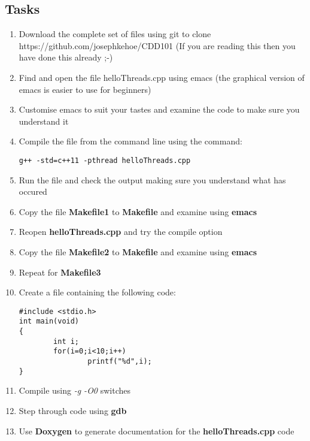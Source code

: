 \documentclass[10pt,a4paper]{article}
\begin{document}
\subsection{Tasks}
\begin{enumerate}
\item Download the complete set of files using git to clone https://github.com/josephkehoe/CDD101
(If you are reading this then you have done this already ;-)
\item  	Find and open the file helloThreads.cpp using emacs (the graphical version of emacs is easier to use for beginners)
\item	Customise emacs to suit your tastes and examine the code to make sure you understand it
\item 	Compile the file from the command line using the command:
\begin{verbatim}
g++ -std=c++11 -pthread helloThreads.cpp
\end{verbatim}

\item	Run the file and check the output making sure you understand what has occured
\item	Copy the file \textbf{Makefile1} to \textbf{Makefile} and examine using \textbf{emacs}
\item	Reopen \textbf{helloThreads.cpp} and try the compile option
\item	Copy the file \textbf{Makefile2} to \textbf{Makefile} and examine using \textbf{emacs}
\item	Repeat for \textbf{Makefile3}
\item	Create a file containing the following code:


\begin{verbatim}
#include <stdio.h>
int main(void)
{
        int i;
        for(i=0;i<10;i++)
                printf("%d",i);
}
\end{verbatim}



\item	Compile using \textit{-g -O0} switches
\item	Step through code using \textbf{gdb}
\item	Use \textbf{Doxygen} to generate documentation for the \textbf{helloThreads.cpp} code
\end{enumerate}
\end{document}
